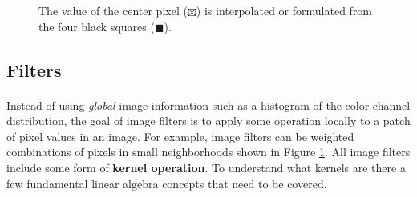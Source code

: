 \documentclass[11pt]{article}
\newcommand\simpleparagraph[1]{%
	\stepcounter{paragraph}\paragraph*{\theparagraph\quad{}#1}}
\renewcommand\theparagraph{}
\begin{document}
\begin{figure}
	\centering
	\hfill
	\caption{The value of the center pixel ($\boxtimes$) is interpolated or formulated from the four black squares ($\blacksquare$).}
	\label{fig:CLASHTileInterpolation}
\end{figure}

\subsection{Filters}
\simpleparagraph{}
Instead of using \textit{global} image information such as a histogram of the color channel distribution, the goal of image filters is to apply some operation locally to a patch of pixel values in an image. For example, image filters can be weighted combinations of pixels in small neighborhoods shown in Figure \ref{fig:CLASHTileInterpolation}. All image filters include some form of \textbf{kernel operation}. To understand what kernels are there a few fundamental linear algebra concepts that need to be covered.
\end{document}
